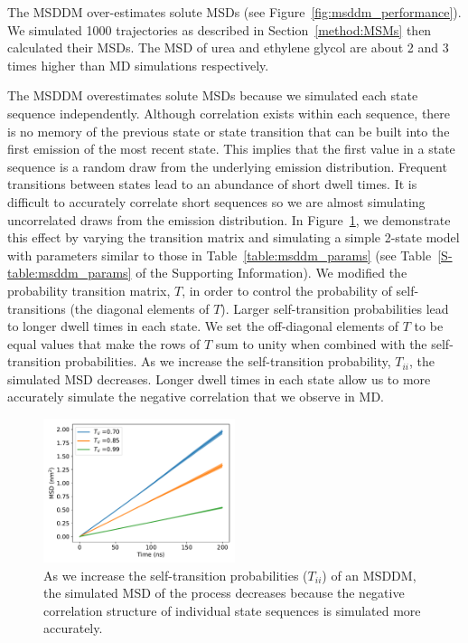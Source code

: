 \documentclass{article}
\begin{document}
  The MSDDM over-estimates solute MSDs (see Figure~\ref{fig:msddm_performance}). 
  We simulated 1000 trajectories as described in Section~\ref{method:MSMs} then
  calculated their MSDs. The MSD of urea and ethylene glycol are about 2 and 3 times
  higher than MD simulations respectively.
  
  The MSDDM overestimates solute MSDs because we simulated each state
  sequence independently. Although correlation exists within each
  sequence, there is no memory of the previous state or state transition 
  that can be built into the first emission of the most recent state. 
  This implies that the first value in a state sequence is a random
  draw from the underlying emission distribution. Frequent transitions
  between states lead to an abundance of short dwell times. It is 
  difficult to accurately correlate short sequences so we are 
  almost simulating uncorrelated draws from the emission distribution.
  In Figure~\ref{fig:T_sensitivity}, we demonstrate this effect by varying 
  the transition matrix and simulating a simple 2-state model with parameters
  similar to those in Table~\ref{table:msddm_params} (see Table~\ref{S-table:msddm_params}
  of the Supporting Information). We modified the probability
  transition matrix, $T$, in order to control the probability of 
  self-transitions (the diagonal elements of $T$). Larger self-transition probabilities lead to longer dwell 
  times in each state. We set the off-diagonal elements of $T$ to be equal values that make the
  rows of $T$ sum to unity when combined with the self-transition probabilities. 
  As we increase the self-transition probability, $T_{ii}$, the simulated MSD 
  decreases. Longer dwell times in each state allow us to more accurately
  simulate the negative correlation that we observe in MD.
  
  \begin{figure}
  \centering
  \includegraphics[width=0.5\textwidth]{T_sensitivity.pdf}
  \caption{As we increase the self-transition probabilities ($T_{ii}$) of an MSDDM,
  the simulated MSD of the process decreases because the negative correlation structure
  of individual state sequences is simulated more accurately.}\label{fig:T_sensitivity}
  \end{figure}
  
\end{document}
